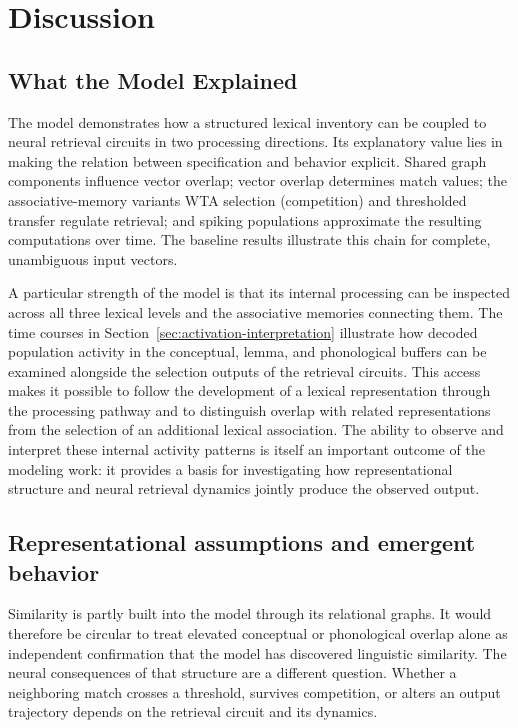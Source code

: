 \section{Discussion}
\subsection{What the Model Explained}
The model demonstrates how a structured lexical inventory can be coupled to neural retrieval circuits in two processing directions. Its explanatory value lies in making the relation between specification and behavior explicit. Shared graph components influence vector overlap; vector overlap determines match values; the associative-memory variants WTA selection (competition) and thresholded transfer regulate retrieval; and spiking populations approximate the resulting computations over time. The baseline results illustrate this chain for complete, unambiguous input vectors.

A particular strength of the model is that its internal processing can be inspected across all three lexical levels and the associative memories connecting them. The time courses in Section~\ref{sec:activation-interpretation} illustrate how decoded population activity in the conceptual, lemma, and phonological buffers can be examined alongside the selection outputs of the retrieval circuits. This access makes it possible to follow the development of a lexical representation through the processing pathway and to distinguish overlap with related representations from the selection of an additional lexical association. The ability to observe and interpret these internal activity patterns is itself an important outcome of the modeling work: it provides a basis for investigating how representational structure and neural retrieval dynamics jointly produce the observed output.

\subsection{Representational assumptions and emergent behavior}
Similarity is partly built into the model through its relational graphs. It would therefore be circular to treat elevated conceptual or phonological overlap alone as independent confirmation that the model has discovered linguistic similarity. The neural consequences of that structure are a different question. Whether a neighboring match crosses a threshold, survives competition, or alters an output trajectory depends on the retrieval circuit and its dynamics.

